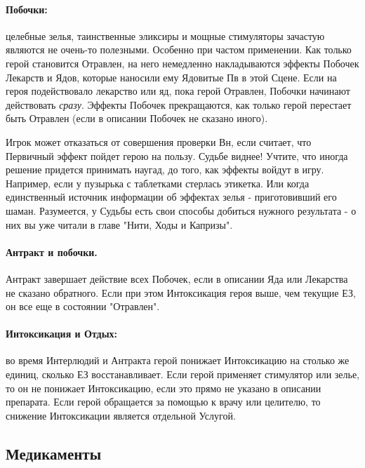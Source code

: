 \paragraph{Побочки:} целебные зелья, таинственные эликсиры и мощные стимуляторы зачастую являются не очень-то полезными. Особенно при частом применении. 
\newline Как только герой становится Отравлен, на него немедленно накладываются эффекты Побочек Лекарств и Ядов, которые наносили ему Ядовитые Пв в этой Сцене. 
\newline Если на героя подействовало лекарство или яд, пока герой Отравлен, Побочки начинают действовать \textit{сразу}.
\newline Эффекты Побочек прекращаются, как только герой перестает быть Отравлен (если в описании Побочек не сказано иного).
\begin{tcolorbox}
    Игрок может отказаться от совершения проверки Вн, если считает, что Первичный эффект пойдет герою на пользу. Судьбе виднее! Учтите, что иногда решение придется принимать наугад, до того, как эффекты войдут в игру. Например, если у пузырька с таблетками стерлась этикетка. Или когда единственный источник информации об эффектах зелья - приготовивший его шаман. Разумеется, у Судьбы есть свои способы добиться нужного результата - о них вы уже читали в главе "Нити, Ходы и Капризы".
\end{tcolorbox}
\paragraph{Антракт и побочки.} Антракт завершает действие всех Побочек, если в описании Яда или Лекарства не сказано обратного. Если при этом Интоксикация героя выше, чем текущие ЕЗ, он все еще в состоянии "Отравлен".
\paragraph{Интоксикация и Отдых:} во время Интерлюдий и Антракта герой понижает Интоксикацию на столько же единиц, сколько ЕЗ восстанавливает. Если герой применяет стимулятор или зелье, то он не понижает Интоксикацию, если это прямо не указано в описании препарата. 
\newline Если герой обращается за помощью к врачу или целителю, то снижение Интоксикации является отдельной Услугой. 

\subsection{Медикаменты}
